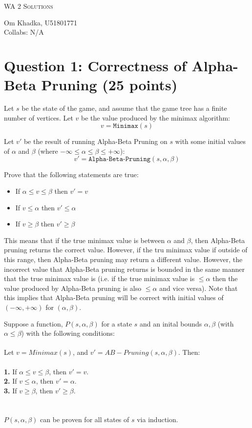 \documentclass[11pt]{article}
\newcommand{\question}[1]{\section*{\normalsize #1}}
\begin{document}
    \begin{center}
        {\Large \textsc{WA 2 Solutions}}
    \end{center}

    \begin{center}
        Om Khadka, U51801771 \\
        Collabs: N/A
    \end{center}

    \question{Question 1: Correctness of Alpha-Beta Pruning (25 points)}
    Let $s$ be the state of the game, and assume that the game tree has a finite number of vertices. Let $v$ be the value produced by the minimax algorithm:
    $$v = \texttt{Minimax}(s)$$

    \noindent Let $v'$ be the result of running Alpha-Beta Pruning on $s$ with some initial values of $\alpha$ and $\beta$ (where $-\infty\le \alpha\le\beta\le+\infty$):
    $$v' = \texttt{Alpha-Beta-Pruning}(s, \alpha, \beta)$$

    \noindent Prove that the following statements are true:
    \begin{itemize}
        \item If $\alpha \le v \le \beta$ then $v' = v$
        \item If $v\le \alpha$ then $v'\le \alpha$
        \item If $v \ge \beta$ then $v'\ge \beta$
    \end{itemize}

    \noindent This means that if the true minimax value is between $\alpha$ and $\beta$, then Alpha-Beta pruning returns the correct value. However, if the tru minimax value if outside of this range, then Alpha-Beta pruning may return a different value. However, the incorrect value that Alpha-Beta pruning returns is bounded in the same manner that the true minimax value is (i.e. if the true minimax value is $\le \alpha$ then the value produced by Alpha-Beta pruning is also $\le \alpha$ and vice versa). Note that this implies that Alpha-Beta pruning will be correct with initial values of $(-\infty, +\infty)$ for $(\alpha, \beta)$.\newline\newline

    \noindent Suppose a function, $P(s, \alpha, \beta)$ for a state $s$ and an inital bounds $\alpha, \beta$ (with $\alpha \le \beta$) with the following conditions:
    \\
    \\
    Let $v = Minimax(s)$, and $v' = AB-Pruning(s, \alpha, \beta)$. Then:
    \\
    \\
    \textbf{1.} If $\alpha \le v \le \beta$, then $v' = v$. \\
    \textbf{2.} If $v \le \alpha$, then $v' = \alpha$. \\
    \textbf{3.} If $v \ge \beta$, then $v' \ge \beta$. \\
    \\
    \\
    $P(s, \alpha, \beta)$ can be proven for all states of $s$ via induction.
    
\end{document}
